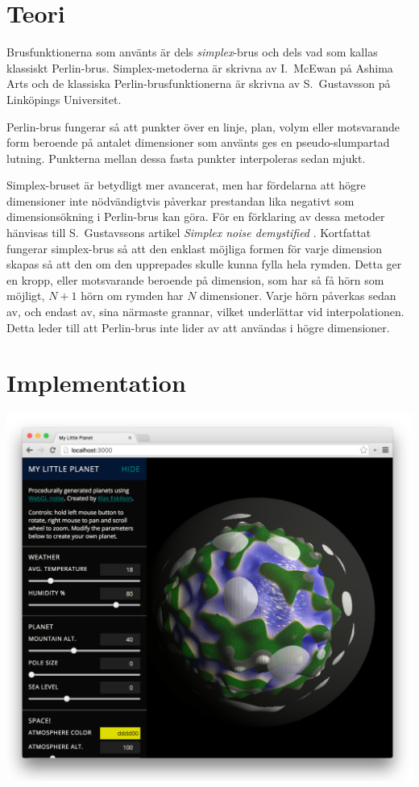 \documentclass[conference]{IEEEtran}
\newenvironment{Figure}
  {\par\medskip\noindent\minipage{\linewidth}}
  {\endminipage\par\medskip}
\begin{document}
\section{Teori}

Brusfunktionerna som använts är dels \emph{simplex}-brus och dels vad som kallas klassiskt Perlin-brus. Simplex-metoderna är skrivna av I.~McEwan på Ashima Arts och de klassiska Perlin-brusfunktionerna är skrivna av S.~Gustavsson på Linköpings Universitet.

Perlin-brus fungerar så att punkter över en linje, plan, volym eller motsvarande form beroende på antalet dimensioner som använts ges en pseudo-slumpartad lutning. Punkterna mellan dessa fasta punkter interpoleras sedan mjukt. \cite{ref:stegu}

Simplex-bruset är betydligt mer avancerat, men har fördelarna att högre dimensioner inte nödvändigtvis påverkar prestandan lika negativt som dimensionsökning i Perlin-brus kan göra. För en förklaring av dessa metoder hänvisas till S.~Gustavssons artikel \emph{Simplex noise demystified} \cite{ref:stegu}. Kortfattat fungerar simplex-brus så att den enklast möjliga formen för varje dimension skapas så att den om den upprepades skulle kunna fylla hela rymden. Detta ger en kropp, eller motsvarande beroende på dimension, som har så få hörn som möjligt, $N + 1$ hörn om rymden har $N$ dimensioner. Varje hörn påverkas sedan av, och endast av, sina närmaste grannar, vilket underlättar vid interpolationen. Detta leder till att Perlin-brus inte lider av att användas i högre dimensioner. \cite{ref:stegu}

\section{Implementation}

\begin{Figure}
  \centering
    \includegraphics[width=\linewidth]{./images/app}
  \label{fig:app}
\end{Figure}
\end{document}
